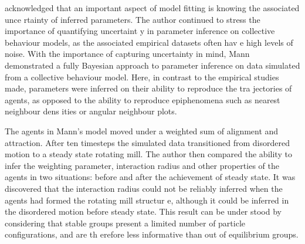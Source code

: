 \textcite{mann11} acknowledged that an important aspect of model fitting is knowing the associated unce
rtainty of inferred parameters. The author continued to stress the importance of quantifying uncertaint
y in parameter inference on collective behaviour models, as the associated empirical datasets often hav
e high levels of noise. With the importance of capturing uncertainty in mind, Mann demonstrated a fully
 Bayesian approach to parameter inference on data simulated from a collective behaviour model. Here, in
 contrast to the empirical studies made, parameters were inferred on their ability to reproduce the tra
jectories of agents, as opposed to the ability to reproduce epiphenomena such as nearest neighbour dens
ities or angular neighbour plots.

The agents in Mann's model moved under a weighted sum of alignment and attraction. After ten timesteps 
the simulated data transitioned from disordered motion to a steady state rotating mill. The author then
 compared the ability to infer the weighting parameter, interaction radius and other properties of the 
agents in two situations: before and after the achievement of steady state. It was discovered that the 
interaction radius could not be reliably inferred when the agents had formed the rotating mill structur
e, although it could be inferred in the disordered motion before steady state. This result can be under
stood by considering that stable groups present a limited number of particle configurations, and are th
erefore less informative than out of equilibrium groups.
